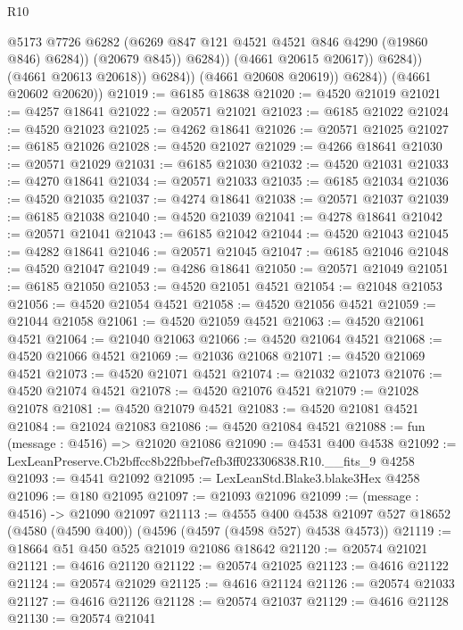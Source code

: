 \begin{lexlean}{R10}
\begin{coremodule}
                                @5173
                                @7726
                                @6282
                                (@6269 @847 @121 @4521 @4521 @846 @4290 (@19860 @846) @6284))
                              (@20679 @845))
                            @6284))
                        (@4661 @20615 @20617))
                      @6284))
                  (@4661 @20613 @20618))
                @6284))
            (@4661 @20608 @20619))
          @6284))
      (@4661 @20602 @20620))
@21019 := @6185 @18638
@21020 := @4520 @21019
@21021 := @4257 @18641
@21022 := @20571 @21021
@21023 := @6185 @21022
@21024 := @4520 @21023
@21025 := @4262 @18641
@21026 := @20571 @21025
@21027 := @6185 @21026
@21028 := @4520 @21027
@21029 := @4266 @18641
@21030 := @20571 @21029
@21031 := @6185 @21030
@21032 := @4520 @21031
@21033 := @4270 @18641
@21034 := @20571 @21033
@21035 := @6185 @21034
@21036 := @4520 @21035
@21037 := @4274 @18641
@21038 := @20571 @21037
@21039 := @6185 @21038
@21040 := @4520 @21039
@21041 := @4278 @18641
@21042 := @20571 @21041
@21043 := @6185 @21042
@21044 := @4520 @21043
@21045 := @4282 @18641
@21046 := @20571 @21045
@21047 := @6185 @21046
@21048 := @4520 @21047
@21049 := @4286 @18641
@21050 := @20571 @21049
@21051 := @6185 @21050
@21053 := @4520 @21051 @4521
@21054 := @21048 @21053
@21056 := @4520 @21054 @4521
@21058 := @4520 @21056 @4521
@21059 := @21044 @21058
@21061 := @4520 @21059 @4521
@21063 := @4520 @21061 @4521
@21064 := @21040 @21063
@21066 := @4520 @21064 @4521
@21068 := @4520 @21066 @4521
@21069 := @21036 @21068
@21071 := @4520 @21069 @4521
@21073 := @4520 @21071 @4521
@21074 := @21032 @21073
@21076 := @4520 @21074 @4521
@21078 := @4520 @21076 @4521
@21079 := @21028 @21078
@21081 := @4520 @21079 @4521
@21083 := @4520 @21081 @4521
@21084 := @21024 @21083
@21086 := @4520 @21084 @4521
@21088 := fun (message : @4516) => @21020 @21086
@21090 := @4531 @400 @4538
@21092 := LexLeanPreserve.Cb2bffcc8b22fbbef7efb3ff023306838.R10.__fits_9 @4258
@21093 := @4541 @21092
@21095 := LexLeanStd.Blake3.blake3Hex @4258
@21096 := @180 @21095
@21097 := @21093 @21096
@21099 := (message : @4516) -> @21090 @21097
@21113 := @4555
    @400
    @4538
    @21097
    @527
    @18652
    (@4580 (@4590 @400))
    (@4596 (@4597 (@4598 @527) @4538 @4573))
@21119 := @18664 @51 @450 @525 @21019 @21086 @18642
@21120 := @20574 @21021
@21121 := @4616 @21120
@21122 := @20574 @21025
@21123 := @4616 @21122
@21124 := @20574 @21029
@21125 := @4616 @21124
@21126 := @20574 @21033
@21127 := @4616 @21126
@21128 := @20574 @21037
@21129 := @4616 @21128
@21130 := @20574 @21041

\end{coremodule}
\end{lexlean}
